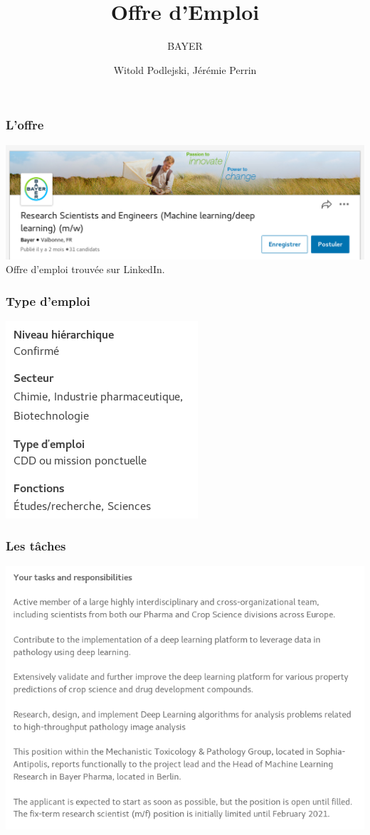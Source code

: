 \documentclass[french]{beamer}
\title{Offre d'Emploi}
\subtitle{BAYER}
\author{Witold Podlejski, Jérémie Perrin}
\date{}
\begin{document}
	
	\maketitle
	
	\begin{frame}[fragile]
		\frametitle{L'offre}
		\includegraphics*[width = \linewidth]{images/intro.png}\\
		Offre d'emploi trouvée sur LinkedIn.
	\end{frame}

	\begin{frame}[fragile]
		\frametitle{Type d'emploi}
		\centering
		\includegraphics*[height= \textheight]{images/type.png}\\
	\end{frame}

	\begin{frame}[fragile]
		\frametitle{Les tâches}
		\includegraphics*[width = \linewidth]{images/tasks.png}\\
	\end{frame}
\end{document}
